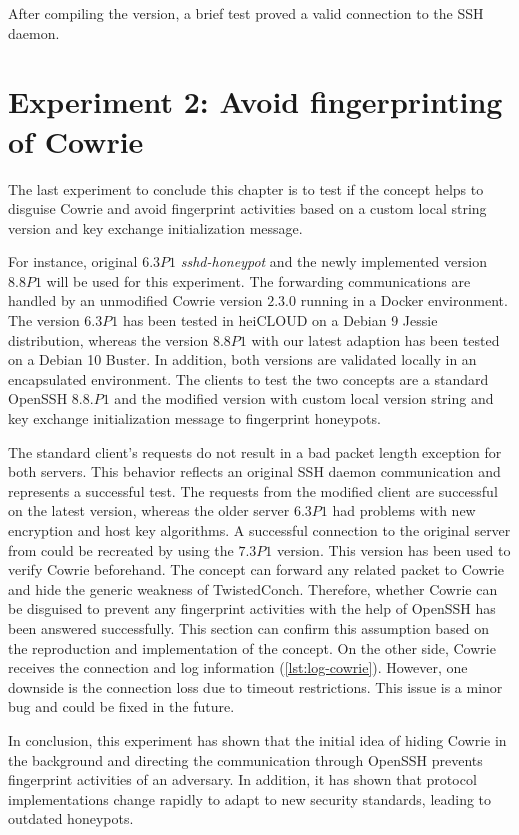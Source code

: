 After compiling the version, a brief test proved a valid connection to the SSH daemon.

\section{Experiment 2: Avoid fingerprinting of Cowrie}

The last experiment to conclude this chapter is to test if the concept helps to disguise Cowrie and avoid fingerprint activities based on a custom local string version and key exchange initialization message.

For instance, \citet{vetterl2020} original $6.3P1$ \textit{sshd-honeypot} and the newly implemented version $8.8P1$ will be used for this experiment.
The forwarding communications are handled by an unmodified Cowrie version $2.3.0$ running in a Docker environment.
The version $6.3P1$ has been tested in heiCLOUD on a Debian 9 Jessie distribution, whereas the version $8.8P1$ with our latest adaption has been tested on a Debian 10 Buster.
In addition, both versions are validated locally in an encapsulated environment.
The clients to test the two concepts are a standard OpenSSH $8.8.P1$ and the modified version with custom local version string and key exchange initialization message to fingerprint honeypots.

The standard client's requests do not result in a bad packet length exception for both servers.
This behavior reflects an original SSH daemon communication and represents a successful test.
The requests from the modified client are successful on the latest version, whereas the older server $6.3P1$ had problems with new encryption and host key algorithms.
A successful connection to the original server from \citet*{vetterl2020} could be recreated by using the $7.3P1$ version.
This version has been used to verify Cowrie beforehand.
The concept can forward any related packet to Cowrie and hide the generic weakness of TwistedConch.
Therefore, whether Cowrie can be disguised to prevent any fingerprint activities with the help of OpenSSH has been answered successfully.
This section can confirm this assumption based on the reproduction and implementation of the concept.
On the other side, Cowrie receives the connection and log information (\autoref{lst:log-cowrie}).
However, one downside is the connection loss due to timeout restrictions.
This issue is a minor bug and could be fixed in the future.

In conclusion, this experiment has shown that the initial idea of hiding Cowrie in the background and directing the communication through OpenSSH prevents fingerprint activities of an adversary.
In addition, it has shown that protocol implementations change rapidly to adapt to new security standards, leading to outdated honeypots.

